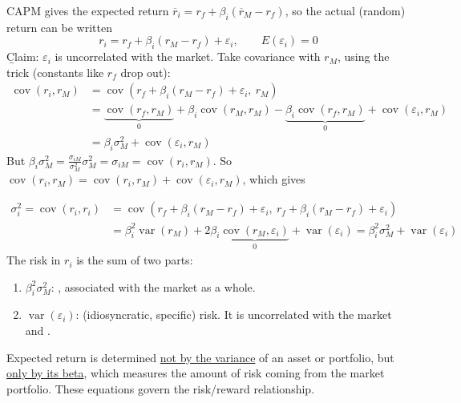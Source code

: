 CAPM gives the expected return $\overline{r}_i = r_f + \beta_i(\overline{r}_M - r_f)$, so the actual (random) return can be written
\[r_i = r_f + \beta_i(r_M - r_f) + \varepsilon_i, \qquad E(\varepsilon_i) = 0\]
\b{Claim}: $\varepsilon_i$ is uncorrelated with the market. Take covariance with $r_M$, using the trick (constants like $r_f$ drop out):
\begin{align*}
    \operatorname{cov}(r_i, r_M) &= \operatorname{cov}\left(r_f + \beta_i(r_M - r_f) + \varepsilon_i,\ r_M\right)\\
    &= \underbrace{\operatorname{cov}(r_f, r_M)}_{0} + \beta_i\operatorname{cov}(r_M, r_M) - \underbrace{\beta_i\operatorname{cov}(r_f, r_M)}_{0} + \operatorname{cov}(\varepsilon_i, r_M)\\
    &= \beta_i\sigma_M^2 + \operatorname{cov}(\varepsilon_i, r_M)
\end{align*}
But $\beta_i\sigma_M^2 = \frac{\sigma_{iM}}{\sigma_M^2}\sigma_M^2 = \sigma_{iM} = \operatorname{cov}(r_i, r_M)$. So $\operatorname{cov}(r_i, r_M) = \operatorname{cov}(r_i, r_M) + \operatorname{cov}(\varepsilon_i, r_M)$, which gives

\begin{align*}
    \sigma_i^2 = \operatorname{cov}(r_i, r_i) &= \operatorname{cov}\left(r_f + \beta_i(r_M - r_f) + \varepsilon_i,\ r_f + \beta_i(r_M - r_f) + \varepsilon_i\right)\\
    &= \beta_i^2\operatorname{var}(r_M) + 2\beta_i\underbrace{\operatorname{cov}(r_M, \varepsilon_i)}_{0} + \operatorname{var}(\varepsilon_i) = \boxed{\beta_i^2\sigma_M^2 + \operatorname{var}(\varepsilon_i)}
\end{align*}
The risk in $r_i$ is the sum of two parts:
\begin{enumerate}[label=(\arabic*)]
    \item $\beta_i^2\sigma_M^2$: , associated with the market as a whole.
    \item $\operatorname{var}(\varepsilon_i)$:  (idiosyncratic, specific) risk. It is uncorrelated with the market and .
\end{enumerate}

Expected return is determined \ul{not by the variance} of an asset or portfolio, but \ul{only by its beta}, which measures the amount of risk coming from the market portfolio. These equations govern the risk/reward relationship.

